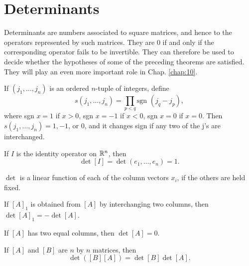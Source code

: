 
\section{Determinants}

Determinants are numbers associated to square matrices, and hence to the
operators represented by such matrices. They are 0 if and only if the
corresponding operator fails to be invertible.
They can therefore be used to decide
whether the hypotheses of some of the preceding theorems are satisfied. They
will play an even more important role in Chap. \ref{chap:10}.

\begin{mydef}
    \label{mydef:9.33}
    If $(j_1, \dots, j_n)$ is an ordered $n$-tuple of integers, define
    \begin{equation}
        \label{eq:9.82}
        s(j_1, \dots, j_n) =
        \prod_{p<q} \text{sgn } (j_q - j_p),
    \end{equation}
    where sgn $x = 1$ if $x > 0$,
    sgn $x = -1$ if $x < 0$,
    sgn $x = 0$ if $x = 0$.
    Then $s(j_1, ... ,j_n) = 1, -1$, or $0$, and it changes sign if any two of the j's are interchanged.
\end{mydef}

\begin{thm}
    \label{thm:9.34}
    \begin{asparaenum}[(a)]
        \item If $I$ is the identity operator on ${\protect\mathbb R}^n$, then
        \begin{equation*}
            \det [I] = \det ( e_1, \dots , e_n) = 1.
        \end{equation*}
        \item $\det$ is a linear function of each of the column vectors $x_i$, if the others are held fixed.
        \item If $[A]_1$ is obtained from $[A]$ by interchanging two columns, then $\det [A]_1 = -\det [A]$.
        \item If $[A]$ has two equal columns, then $\det [A]= 0$.
    \end{asparaenum}
\end{thm}


\begin{thm}
    \label{thm:9.35}
    If $[A]$ and $[B]$ are $n$ by $n$ matrices, then
    \begin{equation*}
        \det ([B][A]) = \det [B] \det [A].
    \end{equation*}
\end{thm}

